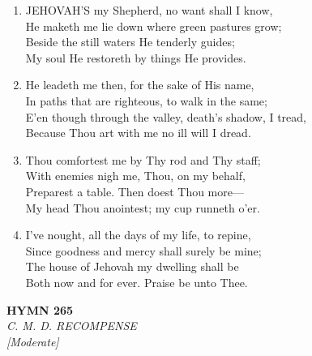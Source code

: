 \documentclass[11pt,a4paper]{article}
\begin{document}
\begin{enumerate}
    \item JEHOVAH'S my Shepherd, no want shall I know, \\
        He maketh me lie down where green pastures grow; \\
        Beside the still waters He tenderly guides; \\
        My soul He restoreth by things He provides.

    \item He leadeth me then, for the sake of His name, \\
        In paths that are righteous, to walk in the same; \\
        E'en though through the valley, death's shadow, I tread, \\
        Because Thou art with me no ill will I dread.

    \item Thou comfortest me by Thy rod and Thy staff; \\
        With enemies nigh me, Thou, on my behalf, \\
        Preparest a table. Then doest Thou more--- \\
        My head Thou anointest; my cup runneth o'er.

    \item I've nought, all the days of my life, to repine, \\
        Since goodness and mercy shall surely be mine; \\
        The house of Jehovah my dwelling shall be \\
        Both now and for ever. Praise be unto Thee.

\end{enumerate}

\newpage
\begin{center}
    {\Large \textbf{HYMN 265}}
    \\
    \textit{C. M. D. RECOMPENSE}
    \\
    \textit{\small [Moderate]}
\end{center}
\vspace{1em}
\end{document}
